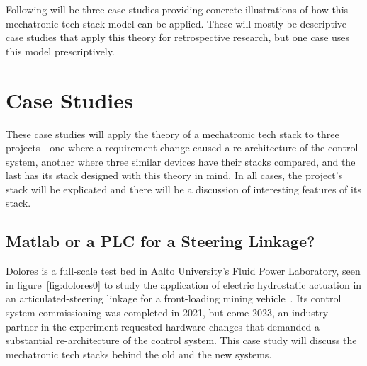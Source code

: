 \documentclass[english,12pt,a4paper,pdftex,eng,utf8]{aaltothesis}
\begin{document}
Following will be three case studies providing concrete illustrations of how this mechatronic tech stack model can be applied. These will mostly be descriptive case studies that apply this theory for retrospective research, but one case uses this model prescriptively.

\clearpage


\section{Case Studies}\label{sec:case_studies}

These case studies will apply the theory of a mechatronic tech stack to three projects---one where a requirement change caused a re-architecture of the control system, another where three similar devices have their stacks compared, and the last has its stack designed with this theory in mind. In all cases, the project's stack will be explicated and there will be a discussion of interesting features of its stack.

\subsection{Matlab or a PLC for a Steering Linkage?}

Dolores is a full-scale test bed in Aalto University's Fluid Power Laboratory, seen in figure~\ref{fig:dolores0} to study the application of electric hydrostatic actuation in an articulated-steering linkage for a front-loading mining vehicle~\cite{Hermansson2021, Helduser1999, Dudzinski1989}. Its control system commissioning was completed in 2021, but come 2023, an industry partner in the experiment requested hardware changes that demanded a substantial re-architecture of the control system. This case study will discuss the mechatronic tech stacks behind the old and the new systems.
\end{document}
